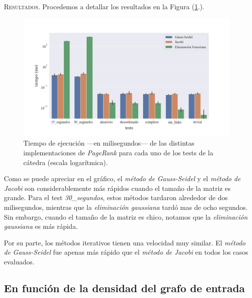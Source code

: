 \vspace{2em}
\noindent \textsc{Resultados}. Procedemos a detallar los resultados en la Figura (\ref{tiempo_ej}.). 

\begin{figure}[!htbp]
    \centering
    \includegraphics[width=.9\textwidth, trim=0 0 0 30]{files/src/.media/tiempo-ejecucion.png}
    \caption{Tiempo de ejecución ---en milisegundos--- de las distintas implementaciones de \textit{PageRank} para cada uno de los tests de la cátedra (escala logarítmica).} \label{tiempo_ej}
\end{figure}


\vspace{1em}
Como se puede apreciar en el gráfico, el \textit{método de Gauss-Seidel} y el \textit{método de Jacobi} son considerablemente más rápidos cuando el tamaño de la matriz es grande. Para el test \textit{30\_segundos}, estos métodos tardaron alrededor de dos milisegundos, mientras que la \textit{eliminación gaussiana} tardó mas de ocho segundos. Sin embargo, cuando el tamaño de la matriz es chico, notamos que la \textit{eliminación gaussiana} es más rápida. 

\vspace{1em}
Por su parte, los métodos iterativos tienen una velocidad muy similar. El \textit{método de Gauss-Seidel} fue apenas más rápido que el \textit{método de Jacobi} en todos los casos evaluados.


\vspace{2em}
\subsection{En función de la densidad del grafo de entrada}
